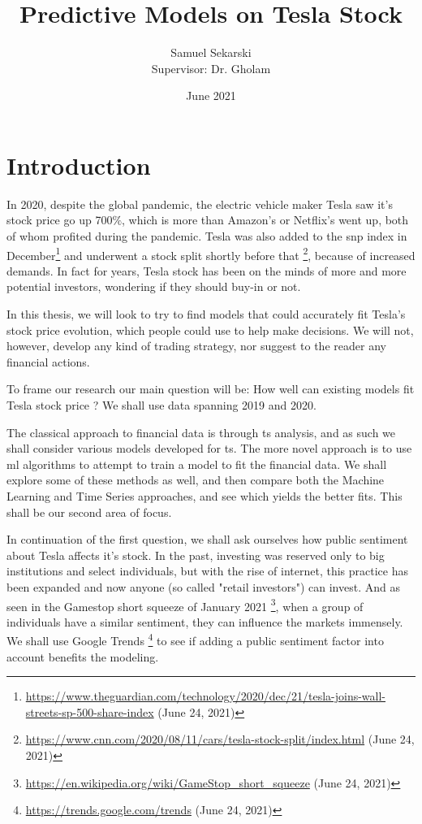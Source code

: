 \documentclass[10pt]{report}
\title{Predictive Models on Tesla Stock}
\author{Samuel Sekarski \\ Supervisor: Dr. Gholam}
\date{June 2021}
\begin{document}
 
\maketitle

\tableofcontents
\listoffigures

\chapter{Introduction}
\label{chap:introduction}
In 2020, despite the global pandemic, the electric vehicle maker Tesla saw it's stock price go up 700$\%$, which is more than Amazon's or Netflix's went up, both of whom profited during the pandemic. Tesla was also added to the \Gls{snp} index in December\footnote{\url{https://www.theguardian.com/technology/2020/dec/21/tesla-joins-wall-streets-sp-500-share-index} (June 24, 2021)} and underwent a stock split shortly before that \footnote{\url{https://www.cnn.com/2020/08/11/cars/tesla-stock-split/index.html} (June 24, 2021)}, because of increased demands. In fact for years, Tesla stock has been on the minds of more and more potential investors, wondering if they should buy-in or not.

In this thesis, we will look to try to find models that could accurately fit Tesla's stock price evolution, which people could use to help make decisions. We will not, however, develop any kind of trading strategy, nor suggest to the reader any financial actions.

To frame our research our main question will be: How well can existing models fit Tesla stock price ?
We shall use data spanning 2019 and 2020.

The classical approach to financial data is through \acrfull{ts} analysis, and as such we shall consider various models developed for \acrlong{ts}. The more novel approach is to use \acrfull{ml} algorithms to attempt to train a model to fit the financial data. We shall explore some of these methods as well, and then compare both the Machine Learning and Time Series approaches, and see which yields the better fits. This shall be our second area of focus.

In continuation of the first question, we shall ask ourselves how public sentiment about Tesla affects it's stock. In the past, investing was reserved only to big institutions and select individuals, but with the rise of internet, this practice has been expanded and now anyone (so called "retail investors") can invest. And as seen in the Gamestop short squeeze of January 2021 \footnote{\url{https://en.wikipedia.org/wiki/GameStop_short_squeeze} (June 24, 2021)}, when a group of individuals have a similar sentiment, they can influence the markets immensely. We shall use Google Trends \footnote{\url{https://trends.google.com/trends} (June 24, 2021)} to see if adding a public sentiment factor into account benefits the modeling.
\end{document}
